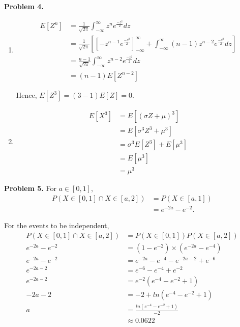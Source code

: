 \documentclass{article}
\begin{document}
\textbf{Problem 4.}
\begin{enumerate}[label={(\alph*)}]
    \item 
    \begin{align}
        E[Z^n] & = \frac{1}{\sqrt{2\pi}}\int_{-\infty}^{\infty}z^ne^{\frac{-z^2}{2}}dz \\
        & = \frac{1}{\sqrt{2\pi}}\left[\left[-z^{n-1}e^{\frac{-z^2}{2}}\right]_{-\infty}^{\infty}+\int_{-\infty}^{\infty}(n-1)z^{n-2}e^{\frac{-z^2}{2}}dz\right] \\
        & = \frac{n-1}{\sqrt{2\pi}}\int_{-\infty}^{\infty}z^{n-2}e^{\frac{-z^2}{2}}dz \\
        & = (n-1)E[Z^{n-2}]
    \end{align}
    
    Hence, $E[Z^3]=(3-1)E[Z]=0.$

    \item 
    \begin{align}
        E[X^3] & = E[\left(\sigma Z+\mu\right)^3] \\
        & = E[\sigma^3Z^3+\mu^3] \\
        & = \sigma^3E[Z^3]+E[\mu^3] \\
        & = E[\mu^3] \\
        & = \mu^3
    \end{align}
\end{enumerate}
\bigbreak

\textbf{Problem 5.}
For $a \in [0,1]$,
\begin{align}
    P(X \in [0,1] \cap X \in [a,2]) & = P(X\in[a,1]) \\
    & = e^{-2a}-e^{-2}.
\end{align}

For the events to be independent,
\begin{align}
    P(X \in [0,1] \cap X \in [a,2]) & =P(X\in [0,1])P(X\in [a,2]) \\
    e^{-2a}-e^{-2} & = \left(1-e^{-2}\right)\times \left(e^{-2a}-e^{-4}\right) \\
    e^{-2a}-e^{-2} & = e^{-2a}-e^{-4}-e^{-2a-2}+e^{-6} \\
    e^{-2a-2} & =e^{-6}-e^{-4}+e^{-2} \\
    e^{-2a-2} & =e^{-2}\left(e^{-4}-e^{-2}+1\right) \\
    -2a-2 & = -2 + ln(e^{-4}-e^{-2}+1) \\
    a & = \frac{ln(e^{-4}-e^{-2}+1)}{-2} \\
    & \approx 0.0622
\end{align}
\bigbreak
\end{document}
